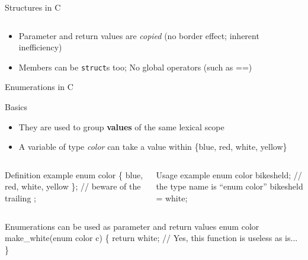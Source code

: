 \begin{Coupe}
\begin{frame}[fragile]{Structures in C}
\begin{columns}
  \end{columns}\vspace{-.7\baselineskip}
  \begin{itemize}
  \item Parameter and return values are \textit{copied} 
    {\small (no border effect; inherent inefficiency)}
  \item {} Members can be \texttt{struct}s too;
  No global operators (such as ==) 
  \end{itemize}
\end{frame}
\begin{frame}[fragile]{Enumerations in C}
  \begin{block}{Basics}
    \begin{itemize}
    \item They are used to group \textbf{values} of the same lexical scope
    \item A variable of type \textit{color} can take a value within
      \{blue, red, white, yellow\}
    \end{itemize}
  \end{block}
  \begin{columns}
    \begin{column}{.33\linewidth} 
  \begin{boitecode}{Definition example}
enum color \{
  blue, red, white, yellow
\}; // beware of the trailing ;
  \end{boitecode}     
    \end{column}
    \begin{column}{.6\linewidth} 
  \begin{boitecode}{Usage example}
enum color bikesheld; // the type name is ``enum color''
bikesheld = white;

  \end{boitecode}     
    \end{column}
  \end{columns}\vspace{-.4\baselineskip}
  \begin{boitecode}{Enumerations can be used as parameter and return values}
enum color make_white(enum color c) \{
  return white; // Yes, this function is useless as is...
\}
  \end{boitecode}


\end{frame}
\end{Coupe}
